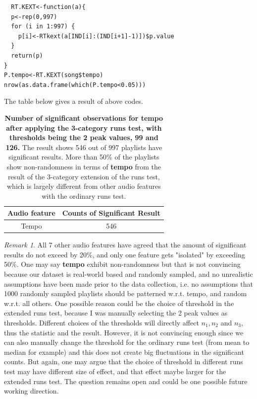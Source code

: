 \documentclass[12pt]{article}
\theoremstyle{plain}
\theoremstyle{definition}
\theoremstyle{remark}
\newtheorem*{remark}{Remark}
\begin{document}
\begin{verbatim}
  RT.KEXT<-function(a){
  p<-rep(0,997)
  for (i in 1:997) {
    p[i]<-RTkext(a[IND[i]:(IND[i+1]-1)])$p.value
  }
  return(p)
}
P.tempo<-RT.KEXT(song$tempo)
nrow(as.data.frame(which(P.tempo<0.05)))
\end{verbatim}

The table below gives a result of above codes.

\begin{table}[h!]
\begin{center}
\begin{tabular}{|c|c|}
    \hline
    Audio feature & Counts of Significant Result\\
    \hline
    Tempo & 546 \\
    \hline
\end{tabular}
\label{table 2}
\caption{\textbf{Number of significant observations for tempo after applying the 3-category runs test, with thresholds being the 2 peak values, 99 and 126.} The result shows 546 out of 997 playlists have significant results. More than 50\% of the playlists show non-randomness in terms of \textbf{tempo} from the result of the 3-category extension of the runs test, which is largely different from other audio features with the ordinary runs test.}
\end{center}
\end{table}

\begin{remark}
All 7 other audio features have agreed that the amount of significant results do not exceed by 20\%, and only one feature gets "isolated" by exceeding 50\%. One may say \textbf{tempo} exhibit non-randomness but that is not convincing because our dataset is real-world based and randomly sampled, and no unrealistic assumptions have been made prior to the data collection, i.e. no assumptions that 1000 randomly sampled playlists should be patterned w.r.t. tempo, and random w.r.t. all others. One possible reason could be the choice of threshold in the extended runs test, because I was manually selecting the 2 peak values as thresholds. Different choices of the thresholds will directly affect $n_1,n_2$ and $n_3$, thus the statistic and the result. However, it is not convincing enough since we can also manually change the threshold for the ordinary runs test (from mean to median for example) and this does not create big fluctuations in the significant counts. But again, one may argue that the choice of threshold in different runs test may have different size of effect, and that effect maybe larger for the extended runs test. The question remains open and could be one possible future working direction.
\end{remark}
\clearpage
\end{document}
